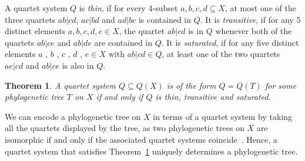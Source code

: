\documentclass{article}
\newtheorem{theorem}{Theorem}
\newcommand{\TODO}[1]{\begingroup\color{red}#1\endgroup}
\begin{document}




A quartet system $Q$ is \textit{thin}, if for every 4-subset ${a, b, c, 
d}\subseteq X$,
at most one of the three quartets $ab|cd$, $ac|bd$ and $ad|bc$ is contained
in $Q$. It is \textit{transitive}, if for any 5 distinct elements $a, b , c , d , e \in X$, the 
quartet
$ab |cd$ is in $Q$ whenever both of the quartets $ab |ce$ and $a b |d e$ are 
contained in $Q$. It is \textit{saturated}, if for any
five distinct elements $a$ , $b$ , $c$ , $d$ , $e \in X$ with $a b 
|c d \in Q$, at least one of
the two quartets $a e|c d$ and $a b |c e$ is also in $Q$.


\begin{theorem}\label{thm:quartet2}
 A quartet system $Q \subseteq Q(X)$ is of the form $Q = Q(T)$ for some
phylogenetic tree $T$ on $X$ if and only if 
$Q$ is thin, transitive and saturated.

\end{theorem}

We can encode a phylogenetic tree on $X$ in terms of a quartet system by taking 
all the quartets displayed by the tree, as 
two phylogenetic 
trees on $X$ are isomorphic if and only if
the associated quartet systems coincide~\cite{Dress2012}.
Hence, a quartet system that satisfies Theorem~\ref{thm:quartet2} uniquely determines a phylogenetic
tree. 
% 





% 

% 
\end{document}
